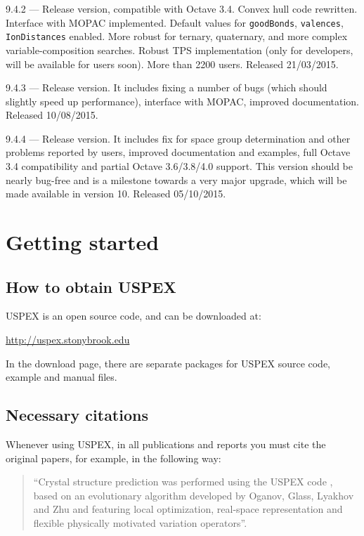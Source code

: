 \documentclass[12pt]{article}
\newcommand{\keyword}[1]{\texttt{#1}}
\begin{document}
{9.4.2 --- Release version, compatible with Octave 3.4. Convex hull code
rewritten. Interface with MOPAC implemented. Default values for
\keyword{goodBonds}, \keyword{valences}, \keyword{IonDistances} enabled.
More robust for ternary, quaternary, and more complex variable-composition
searches. Robust TPS implementation (only for developers, will be available for
users soon). More than 2200 users. Released 21/03/2015.

9.4.3 --- Release version. It includes fixing a number of bugs (which should
slightly speed up performance), interface with MOPAC, improved documentation.
Released 10/08/2015.

9.4.4 --- Release version. It includes fix for space group determination and
other problems reported by users, improved documentation and examples, full
Octave 3.4 compatibility and partial Octave 3.6/3.8/4.0 support. This version
should be nearly bug-free and is a milestone towards a very major upgrade, which
will be made available in version 10. Released 05/10/2015.
}

\newpage
\section{Getting started}

\subsection{How to obtain USPEX}

USPEX is an open source code, and can be downloaded at:
\begin{center}
\textcolor{blue}{\url{http://uspex.stonybrook.edu}}
\end{center}

In the download page, there are separate packages for USPEX source code, example
and manual files.

\subsection{Necessary citations}
Whenever using USPEX, in all publications and reports you must cite the original
papers, for example, in the following way:

\begin{quote}
``Crystal structure prediction was performed using the USPEX code
\cite{Oganov2006, Oganov2011, Lyakhov2013}, based on an evolutionary algorithm
developed by Oganov, Glass, Lyakhov and Zhu and featuring local optimization,
real-space representation and flexible physically motivated variation
operators''.
\end{quote}
\end{document}
